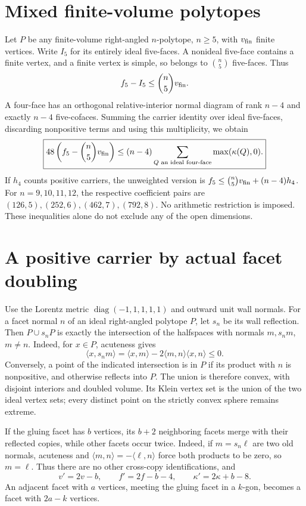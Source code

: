 \documentclass[11pt]{article}
\begin{document}
\section{Mixed finite-volume polytopes}
Let $P$ be any finite-volume right-angled $n$-polytope, $n\ge5$, with
$v_{\rm fin}$ finite vertices. Write $I_5$ for its entirely ideal five-faces.
A nonideal five-face contains a finite vertex, and a finite vertex is simple,
so belongs to $\binom n5$ five-faces. Thus
\[
 f_5-I_5\le\binom n5v_{\rm fin}.
\]
A four-face has an orthogonal relative-interior normal diagram of rank
$n-4$ and exactly $n-4$ five-cofaces. Summing the carrier identity over
ideal five-faces, discarding nonpositive terms and using this multiplicity,
we obtain
\[
 \boxed{48\left(f_5-\binom n5v_{\rm fin}\right)
 \le(n-4)\sum_{Q\text{ an ideal four-face}}\max(\kappa(Q),0).}
\]
If $h_4$ counts positive carriers, the unweighted version is
$f_5\le\binom n5v_{\rm fin}+(n-4)h_4$.
For $n=9,10,11,12$, the respective coefficient pairs are
$(126,5),(252,6),(462,7),(792,8)$. No arithmetic restriction is imposed.
These inequalities alone do not exclude any of the open dimensions.

\section{A positive carrier by actual facet doubling}
Use the Lorentz metric $\operatorname{diag}(-1,1,1,1,1)$ and outward unit
wall normals. For a facet normal $n$ of an ideal right-angled polytope $P$,
let $s_n$ be its wall reflection. Then $P\cup s_nP$ is exactly the
intersection of the halfspaces with normals $m,s_nm$, $m\ne n$.
Indeed, for $x\in P$, acuteness gives
\[
 \langle x,s_nm\rangle
 =\langle x,m\rangle-2\langle m,n\rangle\langle x,n\rangle\le0.
\]
Conversely, a point of the indicated intersection is in $P$ if its product
with $n$ is nonpositive, and otherwise reflects into $P$. The union is
therefore convex, with disjoint interiors and doubled volume. Its Klein
vertex set is the union of the two ideal vertex sets; every distinct point
on the strictly convex sphere remains extreme.

If the gluing facet has $b$ vertices, its $b+2$ neighboring facets merge
with their reflected copies, while other facets occur twice. Indeed, if
$m=s_n\ell$ are two old normals, acuteness and
$\langle m,n\rangle=-\langle\ell,n\rangle$ force both products to be zero,
so $m=\ell$. Thus there are no other cross-copy identifications, and
\[
 v'=2v-b,\qquad f'=2f-b-4,\qquad \kappa'=2\kappa+b-8. \tag{1}
\]
An adjacent facet with $a$ vertices, meeting the gluing facet in a $k$-gon,
becomes a facet with $2a-k$ vertices.
\end{document}
